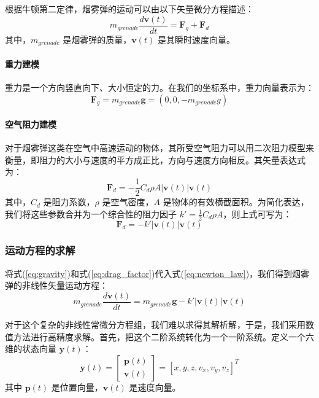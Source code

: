 \documentclass[fontset=SimSun]{ctexart}
\begin{document}
根据牛顿第二定律，烟雾弹的运动可以由以下矢量微分方程描述：
\begin{equation}
m_{grenade} \frac{d\mathbf{v}(t)}{dt} = \mathbf{F}_g + \mathbf{F}_d
\label{eq:newton_law}
\end{equation}
其中，$m_{grenade}$ 是烟雾弹的质量，$\mathbf{v}(t)$ 是其瞬时速度向量。

\paragraph{重力建模}
重力是一个方向竖直向下、大小恒定的力。在我们的坐标系中，重力向量表示为：
\begin{equation}
\mathbf{F}_g = m_{grenade}\mathbf{g} = (0, 0, -m_{grenade}g)
\label{eq:gravity}
\end{equation}

\paragraph{空气阻力建模}
对于烟雾弹这类在空气中高速运动的物体，其所受空气阻力可以用二次阻力模型来衡量，即阻力的大小与速度的平方成正比，方向与速度方向相反。其矢量表达式为：
\begin{equation}
\mathbf{F}_d = - \frac{1}{2} C_d \rho A |\mathbf{v}(t)| \mathbf{v}(t)
\label{eq:drag_quadratic}
\end{equation}
其中，$C_d$ 是阻力系数，$\rho$ 是空气密度，$A$ 是物体的有效横截面积。为简化表达，我们将这些参数合并为一个综合性的阻力因子 $k' = \frac{1}{2} C_d \rho A$，则上式可写为：
\begin{equation}
\mathbf{F}_d = -k' |\mathbf{v}(t)| \mathbf{v}(t)
\label{eq:drag_factor}
\end{equation}

\subsubsection{运动方程的求解}

将式(\ref{eq:gravity})和式(\ref{eq:drag_factor})代入式(\ref{eq:newton_law})，我们得到烟雾弹的非线性矢量运动方程：
\begin{equation}
m_{grenade} \frac{d\mathbf{v}(t)}{dt} = m_{grenade}\mathbf{g} - k' |\mathbf{v}(t)| \mathbf{v}(t)
\label{eq:motion_vector_nonlinear}
\end{equation}

对于这个复杂的非线性常微分方程组，我们难以求得其解析解，于是，我们采用数值方法进行高精度求解。首先，把这个二阶系统转化为一个一阶系统。定义一个六维的状态向量 $\mathbf{y}(t)$：
\begin{equation}
\mathbf{y}(t) = \begin{bmatrix} \mathbf{p}(t) \\ \mathbf{v}(t) \end{bmatrix} = [x, y, z, v_x, v_y, v_z]^T
\end{equation}
其中 $\mathbf{p}(t)$ 是位置向量，$\mathbf{v}(t)$ 是速度向量。
\end{document}
